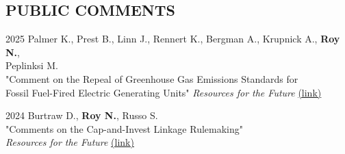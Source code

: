 \documentclass[margin]{res}
\begin{document}
\begin{resume}


\section{PUBLIC COMMENTS}
2025 \hspace{4mm}%
    Palmer K., Prest B., Linn J., Rennert K., Bergman A., Krupnick A., \textbf{Roy N.}, \\
    \hspace*{11mm}  Peplinksi M. \\
    \hspace*{16mm} "Comment on the Repeal of Greenhouse Gas Emissions Standards for \\
    \hspace*{16mm} Fossil Fuel-Fired Electric Generating Units"  \textit{Resources for the Future}   \href{https://www.rff.org/publications/testimony-and-public-comments/comment-on-the-repeal-of-greenhouse-gas-emissions-standards-for-fossil-fuel-fired-electric-generating-units/} {(link)}

2024 \hspace{4mm}%
    Burtraw D., \textbf{Roy N.}, Russo S. \\
    \hspace*{16mm} "Comments on the Cap-and-Invest Linkage Rulemaking" \\
    \hspace*{16mm}  \textit{Resources for the Future}   \href{https://www.rff.org/publications/testimony-and-public-comments/comments-on-the-cap-and-invest-linkage-rulemaking/} {(link)}


\end{resume}
\end{document}
